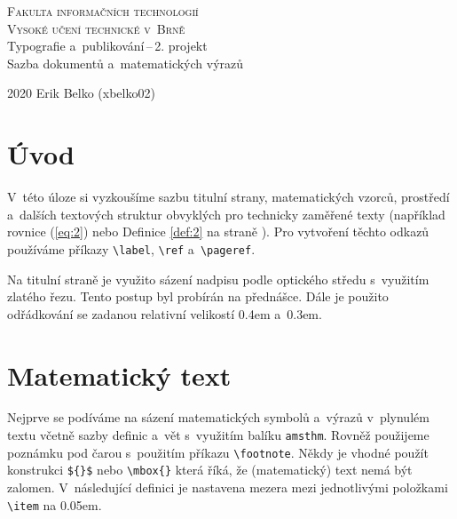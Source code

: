 \documentclass[a4paper, 11pt, twocolumn]{article}[5.3.2020]
\begin{document}
\begin{titlepage}
    \begin{center}
        {\Huge \textsc{Fakulta informačních technologií \\[0.4em] Vysoké učení technické v~Brně}}\\
        {\LARGE Typografie a~publikování\,--\,2. projekt \\[0.3em]
        Sazba dokumentů a~matematických výrazů}
        \vfill
    \end{center}
    {\Large 2020 \hfill Erik Belko (xbelko02)}
\end{titlepage}

\section*{Úvod}\label{page:1}
V~této úloze si vyzkoušíme sazbu titulní strany, matematických vzorců, prostředí a~dalších textových struktur obvyklých pro technicky zaměřené texty (například rovnice (\ref{eq:2}) nebo Definice \ref{def:2} na straně \pageref{page:1}). Pro vytvoření těchto odkazů používáme příkazy \verb|\label|, \verb|\ref| a~\verb|\pageref|.
\par Na titulní straně je využito sázení nadpisu podle optického středu s~využitím zlatého řezu. Tento postup byl probírán na přednášce. Dále je použito odřádkování se zadanou relativní velikostí 0.4em a~0.3em.

\section{Matematický text}
Nejprve se podíváme na sázení matematických symbolů a~výrazů v~plynulém textu včetně sazby definic a~vět s~využitím balíku \verb|amsthm|. Rovněž použijeme poznámku pod čarou s~použitím příkazu \verb|\footnote|. Někdy je vhodné
použít konstrukci \verb|${}$| nebo \verb|\mbox{}| která říká, že (matematický) text nemá být zalomen. V~následující definici je nastavena mezera mezi jednotlivými položkami \verb|\item| na 0.05em.
\end{document}
